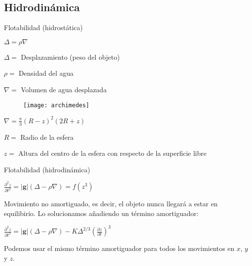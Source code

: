 \subsection{Hidrodinámica}

\begin{frame}{Flotabilidad (hidrostática)}

\begin{center}
$\Delta = \rho \nabla$
\end{center}

$\Delta = $ Desplazamiento (peso del objeto)

$\rho = $ Densidad del agua

$\nabla = $ Volumen de agua desplazada

\begin{figure}
  \texttt{[image: archimedes]} 
\end{figure}

\pause

\begin{center}
$\nabla = \frac{\pi}{3} \left( R - z \right)^2 \left( 2 R + z \right)$
\end{center}

$R = $ Radio de la esfera

$z = $ Altura del centro de la esfera con respecto de la superficie libre

\end{frame}

\begin{frame}{Flotabilidad (hidrodinámica)}

\begin{center}
$\frac{\partial^2 z}{\partial t^2} = \vert \mathbf{g} \vert \left( \Delta - \rho \nabla \right)
= f(z^3)
$
\end{center}

Movimiento no amortiguado, es decir, el objeto nunca llegará a estar en
equilibirio.
%
Lo solucionamos añadiendo un término amortiguador:

\begin{center}
$\frac{\partial^2 z}{\partial t^2} = \vert \mathbf{g} \vert \left( \Delta - \rho \nabla \right)
- K \Delta^{2/3} \left(\frac{\partial z}{\partial t}\right)^3$
\end{center}

Podemos usar el mismo término amortiguador para todos los movimientos en $x$,
$y$ y $z$.

\end{frame}

